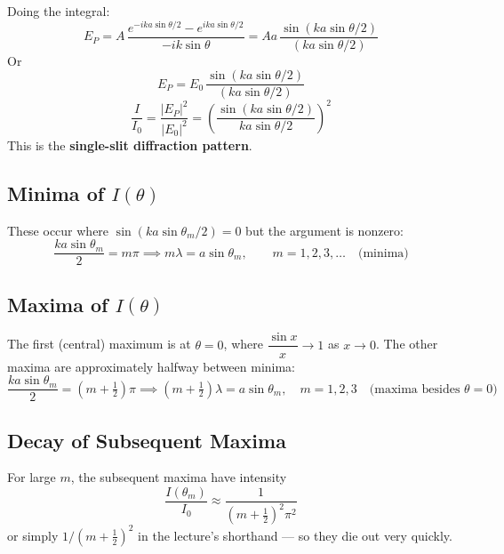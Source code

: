 \documentclass[11pt]{report}
\begin{document}
Doing the integral:
\begin{equation}
E_P = A\,\frac{e^{-ika\sin\theta/2} - e^{ika\sin\theta/2}}{-ik\sin\theta} = Aa\,\frac{\sin(ka\sin\theta/2)}{(ka\sin\theta/2)}
\end{equation}
Or
\begin{equation}
\boxed{E_P = E_0\,\frac{\sin(ka\sin\theta/2)}{(ka\sin\theta/2)}}
\end{equation}
\begin{equation}
\boxed{\frac{I}{I_0} = \frac{|E_P|^2}{|E_0|^2} = \left(\frac{\sin(ka\sin\theta/2)}{ka\sin\theta/2}\right)^2}
\end{equation}
This is the \textbf{single-slit diffraction pattern}.

\subsection*{Minima of $I(\theta)$}

These occur where $\sin(ka\sin\theta_m/2) = 0$ but the argument is nonzero:
\begin{equation}
\frac{ka\sin\theta_m}{2} = m\pi \implies \boxed{m\lambda = a\sin\theta_m, \qquad m = 1, 2, 3, \ldots \quad \text{(minima)}}
\end{equation}

\subsection*{Maxima of $I(\theta)$}

The first (central) maximum is at $\theta = 0$, where $\dfrac{\sin x}{x} \to 1$ as $x \to 0$. The other maxima are approximately halfway between minima:
\begin{equation}
\frac{ka\sin\theta_m}{2} = (m + \tfrac{1}{2})\pi \implies \boxed{(m + \tfrac{1}{2})\lambda = a\sin\theta_m, \quad m = 1, 2, 3 \quad \text{(maxima besides } \theta = 0\text{)}}
\end{equation}

\subsection*{Decay of Subsequent Maxima}

For large $m$, the subsequent maxima have intensity
\begin{equation}
\frac{I(\theta_m)}{I_0} \approx \frac{1}{(m + \tfrac{1}{2})^2 \pi^2}
\end{equation}
or simply $1/(m+\tfrac{1}{2})^2$ in the lecture's shorthand --- so they die out very quickly.
\end{document}
